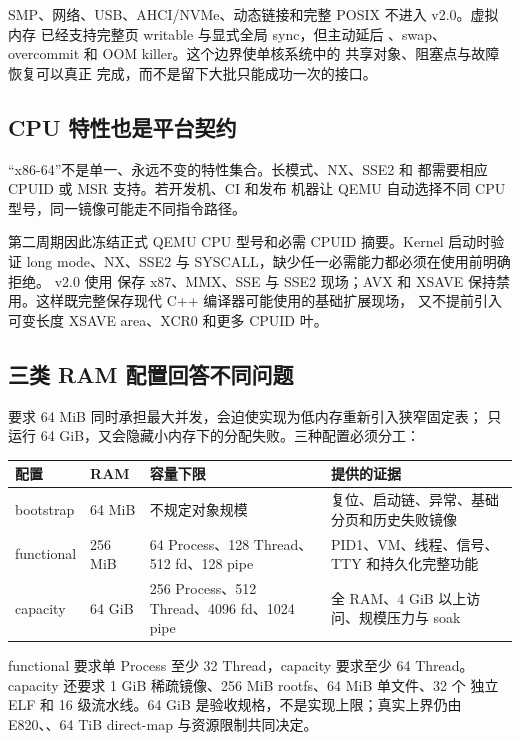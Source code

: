 SMP、网络、USB、AHCI/NVMe、动态链接和完整 POSIX 不进入 v2.0。虚拟内存
已经支持完整页 writable  与显式全局 sync，但主动延后
、swap、overcommit 和 OOM killer。这个边界使单核系统中的
共享对象、阻塞点与故障恢复可以真正
完成，而不是留下大批只能成功一次的接口。

\subsection{CPU 特性也是平台契约}

“x86-64”不是单一、永远不变的特性集合。长模式、NX、SSE2 和
 都需要相应 CPUID 或 MSR 支持。若开发机、CI 和发布
机器让 QEMU 自动选择不同 CPU 型号，同一镜像可能走不同指令路径。

第二周期因此冻结正式 QEMU CPU 型号和必需 CPUID 摘要。Kernel 启动时验证
long mode、NX、SSE2 与 SYSCALL，缺少任一必需能力都必须在使用前明确拒绝。
v2.0 使用  保存 x87、MMX、SSE 与 SSE2 现场；AVX
和 XSAVE 保持禁用。这样既完整保存现代 C++ 编译器可能使用的基础扩展现场，
又不提前引入可变长度 XSAVE area、XCR0 和更多 CPUID 叶。

\subsection{三类 RAM 配置回答不同问题}

要求 64 MiB 同时承担最大并发，会迫使实现为低内存重新引入狭窄固定表；
只运行 64 GiB，又会隐藏小内存下的分配失败。三种配置必须分工：

\begin{longtable}{L{0.16\textwidth}L{0.13\textwidth}L{0.18\textwidth}L{0.39\textwidth}}
\toprule
\textbf{配置} & \textbf{RAM} & \textbf{容量下限} & \textbf{提供的证据}\\
\midrule
bootstrap & 64 MiB & 不规定对象规模 & 复位、启动链、异常、基础分页和历史失败镜像\\
functional & 256 MiB & 64 Process、128 Thread、512 fd、128 pipe & PID1、VM、线程、信号、TTY 和持久化完整功能\\
capacity & 64 GiB & 256 Process、512 Thread、4096 fd、1024 pipe & 全 RAM、4 GiB 以上访问、规模压力与 soak\\
\bottomrule
\end{longtable}

functional 要求单 Process 至少 32 Thread，capacity 要求至少 64 Thread。
capacity 还要求 1 GiB 稀疏镜像、256 MiB rootfs、64 MiB 单文件、32 个
独立 ELF 和 16 级流水线。64 GiB 是验收规格，不是实现上限；真实上界仍由
E820、、64 TiB direct-map 与资源限制共同决定。

